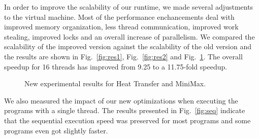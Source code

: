 \documentclass[10pt]{article}
\begin{document}
In order to improve the scalability of our runtime, we made several adjustments
to the virtual machine. Most of the performance enchancements deal with improved
memory organization, less thread communication, improved work stealing, improved
locks and an overall increase of parallelism. We compared the scalability of the
improved version against the scalability of the old version and the results are
shown in Fig.~\ref{fig:res1}, Fig.~\ref{fig:res2} and Fig.~\ref{fig:res3}. The
overall speedup for 16 threads has improved from 9.25 to a 11.75-fold speedup.

\begin{figure}[ht]
\begin{center}
\end{center}
\begin{center}
\end{center}
\caption{New experimental results for Heat Transfer and MiniMax.}
\label{fig:res3}
\end{figure}

We also measured the impact of our new optimizations when executing the programs
with a single thread. The results presented in Fig.~\ref{fig:seq} indicate
that the sequential execution speed was preserved for most programs and some
programs even got slightly faster.
\end{document}
